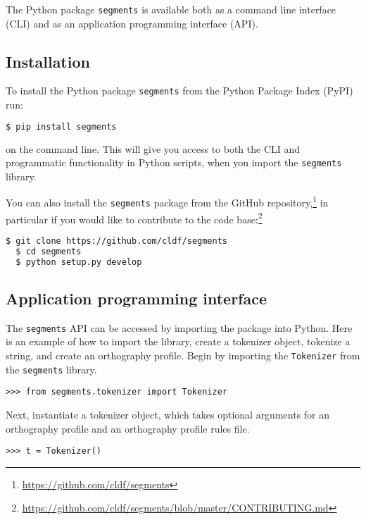 \documentclass[output=book,nonflat,modfonts,
citecolor=brown,
		]{langsci/langscibook}\usepackage[]{graphicx}\usepackage[]{color}
\begin{document}
The Python package \texttt{segments} is available both as a command line interface (CLI) and as an application programming interface (API).


\subsection*{Installation}

To install the Python package \texttt{segments} \citep{ForkelMoran2018} from the Python Package Index (PyPI) run:

\begin{lstlisting}[language=bash, basicstyle=\myfont]
  $ pip install segments
\end{lstlisting}

\noindent on the command line. This will give you access to both the CLI and programmatic functionality in Python scripts, when you import the \texttt{segments} library.

You can also install the \texttt{segments} package from the GitHub repository,\footnote{\url{https://github.com/cldf/segments}} in particular if you would like to contribute to the code base:\footnote{\url{https://github.com/cldf/segments/blob/master/CONTRIBUTING.md}}

\begin{lstlisting}[language=bash, basicstyle=\myfont]
  $ git clone https://github.com/cldf/segments
  $ cd segments
  $ python setup.py develop
\end{lstlisting}


\subsection*{Application programming interface}
The \texttt{segments} API can be accessed by importing the package into Python. Here is an example of how to import the library, create a tokenizer object, tokenize a string, and create an orthography profile. Begin by importing the \texttt{Tokenizer} from the \texttt{segments} library.

\begin{lstlisting}[basicstyle=\myfont]
>>> from segments.tokenizer import Tokenizer
\end{lstlisting}

\noindent Next, instantiate a tokenizer object, which takes optional arguments for an orthography profile and an orthography profile rules file.

\begin{lstlisting}[basicstyle=\myfont]
>>> t = Tokenizer()
\end{lstlisting}
\end{document}
